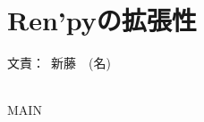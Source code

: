 \documentclass[a4paper]{jarticle}
\newcommand{\resp}[1]{\begin{flushright}文責：~#1\end{flushright}~\\}
\begin{document}
\fi

\section{Ren'pyの拡張性}
  \resp{新藤　(名)}


\expandafter\ifx\csname MAIN \endcsname\relax
  
\end{document}
